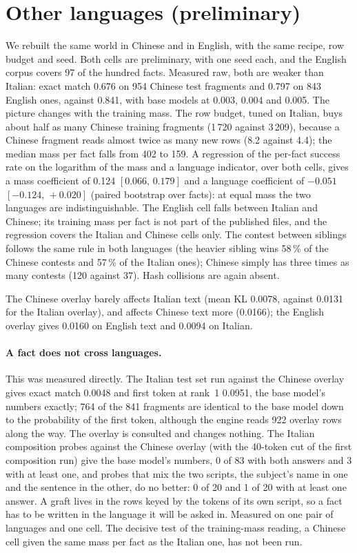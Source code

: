 \documentclass[10pt,a4paper]{article}
\begin{document}
\section{Other languages (preliminary)}
\label{sec:lang}

We rebuilt the same world in Chinese and in English, with the same recipe, row budget and
seed. Both cells are preliminary, with one seed each, and the English corpus covers 97 of the
hundred facts. Measured raw, both are weaker than Italian: exact match 0.676 on 954 Chinese
test fragments and 0.797 on 843 English ones, against 0.841, with base models at 0.003, 0.004
and 0.005. The picture changes with the training mass. The row budget, tuned on
Italian, buys about half as many Chinese training fragments (1\,720 against 3\,209), because
a Chinese fragment reads almost twice as many new rows (8.2 against 4.4); the median mass
per fact falls from 402 to 159. A regression of the per-fact success rate on the logarithm
of the mass and a language indicator, over both cells, gives a mass coefficient of 0.124
$[0.066,\,0.179]$ and a language coefficient of $-0.051$ $[-0.124,\,+0.020]$ (paired
bootstrap over facts): at equal mass the two languages are indistinguishable. The English
cell falls between Italian and Chinese; its training mass per fact is not part of the
published files, and the regression covers the Italian and Chinese cells only. The contest
between siblings follows the same rule in both languages (the heavier sibling wins 58\,\% of
the Chinese contests and 57\,\% of the Italian ones); Chinese simply has three times as many
contests (120 against 37). Hash collisions are again absent.

The Chinese overlay barely affects Italian text (mean KL 0.0078, against 0.0131 for the
Italian overlay), and affects Chinese text more (0.0166); the English overlay gives 0.0160 on
English text and 0.0094 on Italian.

\paragraph{A fact does not cross languages.} This was measured directly. The Italian test set
run against the Chinese overlay gives exact match 0.0048 and first token at rank~1 0.0951,
the base model's numbers exactly; 764 of the 841 fragments are identical to the base model
down to the probability of the first token, although the engine reads 922 overlay rows along
the way. The overlay is consulted and changes nothing. The Italian composition probes against
the Chinese overlay (with the 40-token cut of the first composition run) give the base
model's numbers, 0 of 83 with both answers and 3 with at least one, and probes that mix the
two scripts, the subject's name in one and the sentence in the other, do no better: 0 of 20
and 1 of 20 with at least one answer. A graft lives in the rows keyed by the tokens of its own
script, so a fact has to be written in the language it will be asked in. Measured on one pair
of languages and one cell. The decisive test of the training-mass reading, a Chinese cell
given the same mass per fact as the Italian one, has not been run.
\end{document}
